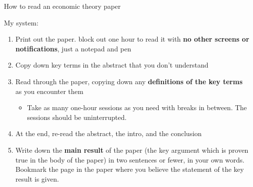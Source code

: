 \documentclass[aspectratio=169]{beamer}
\begin{document}
\begin{frame}{How to read an economic theory paper}

My system: 
\begin{enumerate}
    \item Print out the paper. block out one hour to read it with \textbf{no other screens or notifications}, just a notepad and pen 
    \item Copy down key terms in the abstract that you don't understand 
    \item Read through the paper, copying down any \textbf{definitions of the key terms} as you encounter them
    \begin{itemize}
        \item Take as many one-hour sessions as you need with breaks in between. The sessions should be uninterrupted. 
    \end{itemize}
    \item At the end, re-read the abstract, the intro, and the conclusion 
    \item Write down the \textbf{main result} of the paper (the key argument which is proven true in the body of the paper) in two sentences or fewer, in your own words. Bookmark the page in the paper where you believe the statement of the key result is given. 
\end{enumerate}

    
\end{frame}
\end{document}
